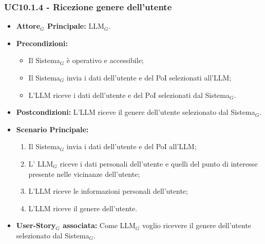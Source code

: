 \documentclass[10pt]{article}
\begin{document}
\begin{justify}
\subsubsection{\textbf{UC10.1.4 - Ricezione genere dell'utente}}
\begin{itemize}
    \item \textbf{Attore$_G$ Principale:} LLM$_G$.
    \item \textbf{Precondizioni:} 
        \begin{itemize}
          \item Il Sistema$_G$ è operativo e accessibile;
          \item Il Sistema$_G$ invia i dati dell'utente e del PoI selezionati all'LLM;
            \item L'LLM riceve i dati dell'utente e del PoI selezionati dal Sistema$_G$.
        \end{itemize}
      \item \textbf{Postcondizioni:} L'LLM riceve il genere dell'utente selezionato dal Sistema$_G$.
    \item \textbf{Scenario Principale:} 
        \begin{enumerate}
          \item Il Sistema$_G$ invia i dati dell'utente e del PoI all'LLM;
        \item L' LLM$_G$ riceve i dati personali dell'utente e quelli del punto di interesse presente nelle vicinanze dell'utente;
          \item L'LLM riceve le informazioni personali dell'utente;
          \item L'LLM riceve il genere dell'utente.
        \end{enumerate}
      \item \textbf{User-Story$_G$ associata:} Come LLM$_G$ voglio ricevere il genere dell'utente selezionato dal Sistema$_G$.
\end{itemize}

\end{justify}
\end{document}
